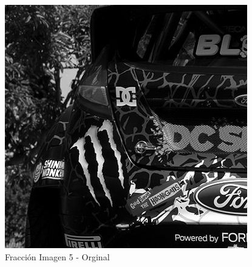 \documentclass[a4paper]{article}
\begin{document}
     \begin{figure}[H]
    \centering
    \includegraphics[scale=0.5]{imagenes/imagen5informeOriginal.png}
    \caption{Fracci\'on Imagen 5 - Orginal}
    \end{figure}
\end{document}
